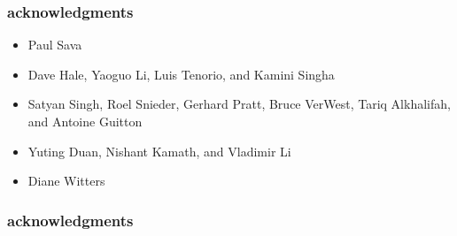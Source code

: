 \begin{frame}
\end{frame}

\begin{frame}
\end{frame}


\begin{frame}
\end{frame}

\begin{frame}
\end{frame}

\begin{frame}\frametitle{acknowledgments}
\Large
\begin{itemize}

\item {Paul Sava}\\
\item {Dave Hale, Yaoguo Li, Luis Tenorio, and Kamini Singha}\\
\item {Satyan Singh, Roel Snieder, Gerhard Pratt, Bruce VerWest, Tariq Alkhalifah, and Antoine Guitton}\\
\item {Yuting Duan, Nishant Kamath, and Vladimir Li} 
\item {Diane Witters}
\end{itemize}
\end{frame}

\begin{frame}\frametitle{acknowledgments}
\end{frame}

\begin{frame}
\end{frame}







